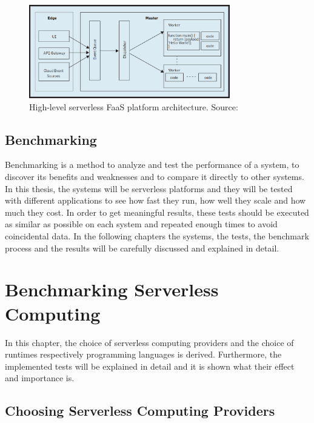 \begin{figure}[htp]
\begin{center}
\includegraphics[width=0.78\textwidth]{bilder/FaaS_architecture.png}
\captionsetup[table]{justification=centering, labelfont=bf}
\caption[High-level serverless FaaS platform architecture]{High-level serverless FaaS platform architecture. Source: \cite{riseofserverless}}
\label{fig:faas_achritecture}
\end{center}
\end{figure}

\newpage
\section{Benchmarking}
Benchmarking is a method to analyze and test the performance of a system, to discover its benefits and weaknesses and to compare it directly to other systems. In this thesis, the systems will be serverless platforms and they will be tested with different applications to see how fast they run, how well they scale and how much they cost. In order to get meaningful results, these tests should be executed as similar as possible on each system and repeated enough times to avoid coincidental data. In the following chapters the systems, the tests, the benchmark process and the results will be carefully discussed and explained in detail.


\chapter{Benchmarking Serverless Computing}
In this chapter, the choice of serverless computing providers and the choice of runtimes respectively programming languages is derived. Furthermore, the implemented tests will be explained in detail and it is shown what their effect and importance is.

\section{Choosing Serverless Computing Providers}
\label{sec:CSP}

